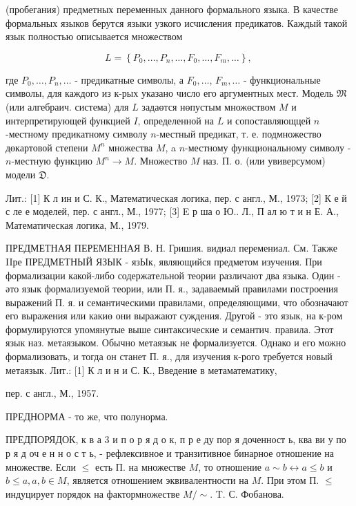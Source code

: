 \documentclass[10pt]{article}
\begin{document}
(пробегания) предметных переменных данного формального языка. В качестве формальных языков берутся языки узкого исчисления предикатов. Каждый такой язык полностью описывается множеством



\[

L=\left\{P_{0}, \ldots, P_{n}, \ldots, F_{0}, \ldots, F_{m}, \ldots\right\} \text {, }

\]



где $P_{0}, \ldots, P_{n}, \ldots$ - предикатные символы, а $F_{0}, \ldots$, $F_{m}, \ldots$ - функциональные символы, для каждого из к-рых указано число его аргументных мест. Модель $\mathfrak{M}$ (или алгебраич. система) для $L$ задаөтся нөпустым множөством $M$ и интерпретирующей функцией $I$, определенной на $L$ и сопоставляющцей $n$-местному предикатному символу $n$-местный предикат, т. е. подмножество дөкартовой степени $M^{n}$ множества $M$, a $n$-местному функциональному символу - $n$-местную функцию $M^{n} \rightarrow M$. Множество $M$ наз. П. о. (или увиверсумом) модели $\mathfrak{D}$.



Лит.: [1] К л ин и С. К., Математическая логика, пер. с англ., М., 1973; [2] К е й с ле е моделей, пер. с англ., М., 1977; [3] E р ша о Ю.. Л., П ал ю т и н Е. А., Математическая логика, М., 1979.



ПРЕДМЕТНАЯ ПЕРЕМЕННАЯ В. Н. Гришия. видиал перемениал. См. Также IIре ПРЕДМЕТНЫЙ ЯЗЫК - язЫк, являющийся предметом изучения. При формализации какой-либо содержательной теории различают два языка. Один - әто язык формализуемой теории, или П. я., задаваемый правилами построения выражений П. я. и семантическими правилами, определяющими, что обозначают его выражения или какиө они выражают суждения. Другой - это язык, на к-ром формулируются упомянутые выше синтаксические и семантич. правила. Этот язык наз. метаязыком. Обычно метаязык не формализуется. Однако и его можно формализовать, и тогда он станет П. я., для изучения к-рого требуется новый метаязык. Лит.: [1] К л и н и С. К., Введение в метаматематику,

пер. с англ., М., 1957.



ПРЕДНОРМА - то же, что полунорма.



ПРЕДПОРЯДОК, к в а 3 и п о р я д о к, п р е ду пор я доченност ь, ква ви у по р я д оч е н н о с т ь, - рефлексивное и транзитивное бинарное отношение на множестве. Если $\leq$ есть П. на множестве $M$, то отношение $a \sim b \leftrightarrow a \leq b$ и $b \leq a, a, b \in M$, является отношением эквивалентности на $M$. При этом П. $\leq$ индуцирует порядок на фактормножестве $M / \sim$. T. С. Фобанова.
\end{document}
